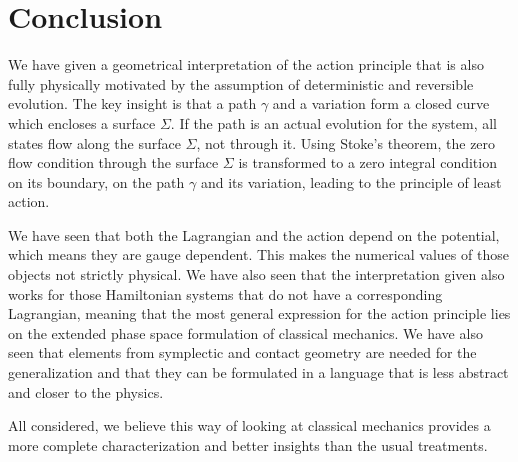 \documentclass[10pt,twocolumn, nofootinbib]{revtex4-2}
\begin{document}
\section{Conclusion}

We have given a geometrical interpretation of the action principle that is also fully physically motivated by the assumption of deterministic and reversible evolution. The key insight is that a path $\gamma$ and a variation form a closed curve which encloses a surface $\Sigma$. If the path is an actual evolution for the system, all states flow along the surface $\Sigma$, not through it. Using Stoke's theorem, the zero flow condition through the surface $\Sigma$ is transformed to a zero integral condition on its boundary, on the path $\gamma$ and its variation, leading to the principle of least action.

We have seen that both the Lagrangian and the action depend on the potential, which means they are gauge dependent. This makes the numerical values of those objects not strictly physical. We have also seen that the interpretation given also works for those Hamiltonian systems that do not have a corresponding Lagrangian, meaning that the most general expression for the action principle lies on the extended phase space formulation of classical mechanics. We have also seen that elements from symplectic and contact geometry are needed for the generalization and that they can be formulated in a language that is less abstract and closer to the physics.

All considered, we believe this way of looking at classical mechanics provides a more complete characterization and better insights than the usual treatments.


\end{document}
